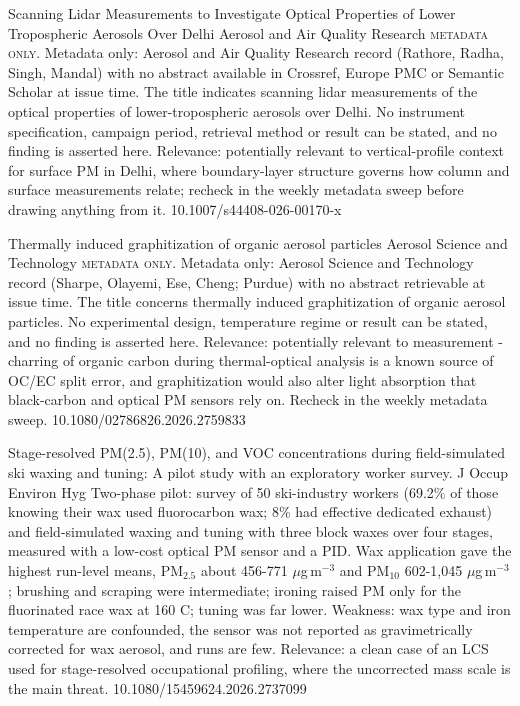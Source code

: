 \documentclass[10pt]{article}
\begin{document}
{Scanning Lidar Measurements to Investigate Optical Properties of Lower Tropospheric Aerosols Over Delhi}
{Aerosol and Air Quality Research}
{\textsc{metadata only.} Metadata only: Aerosol and Air Quality Research record (Rathore, Radha, Singh, Mandal) with no abstract available in Crossref, Europe PMC or Semantic Scholar at issue time. The title indicates scanning lidar measurements of the optical properties of lower-tropospheric aerosols over Delhi. No instrument specification, campaign period, retrieval method or result can be stated, and no finding is asserted here. Relevance: potentially relevant to vertical-profile context for surface PM in Delhi, where boundary-layer structure governs how column and surface measurements relate; recheck in the weekly metadata sweep before drawing anything from it.}
{10.1007/s44408-026-00170-x}

{Thermally induced graphitization of organic aerosol particles}
{Aerosol Science and Technology}
{\textsc{metadata only.} Metadata only: Aerosol Science and Technology record (Sharpe, Olayemi, Ese, Cheng; Purdue) with no abstract retrievable at issue time. The title concerns thermally induced graphitization of organic aerosol particles. No experimental design, temperature regime or result can be stated, and no finding is asserted here. Relevance: potentially relevant to measurement - charring of organic carbon during thermal-optical analysis is a known source of OC/EC split error, and graphitization would also alter light absorption that black-carbon and optical PM sensors rely on. Recheck in the weekly metadata sweep.}
{10.1080/02786826.2026.2759833}

\par{}\baselineskip{}\baselineskip
{}

{Stage-resolved PM(2.5), PM(10), and VOC concentrations during field-simulated ski waxing and tuning: A pilot study with an exploratory worker survey.}
{J Occup Environ Hyg}
{Two-phase pilot: survey of 50 ski-industry workers (69.2\% of those knowing their wax used fluorocarbon wax; 8\% had effective dedicated exhaust) and field-simulated waxing and tuning with three block waxes over four stages, measured with a low-cost optical PM sensor and a PID. Wax application gave the highest run-level means, PM$_{2.5}$ about 456-771 $\mu$g\,m$^{-3}$ and PM$_{10}$ 602-1,045 $\mu$g\,m$^{-3}$; brushing and scraping were intermediate; ironing raised PM only for the fluorinated race wax at 160 C; tuning was far lower. Weakness: wax type and iron temperature are confounded, the sensor was not reported as gravimetrically corrected for wax aerosol, and runs are few. Relevance: a clean case of an LCS used for stage-resolved occupational profiling, where the uncorrected mass scale is the main threat.}
{10.1080/15459624.2026.2737099}
\end{document}
